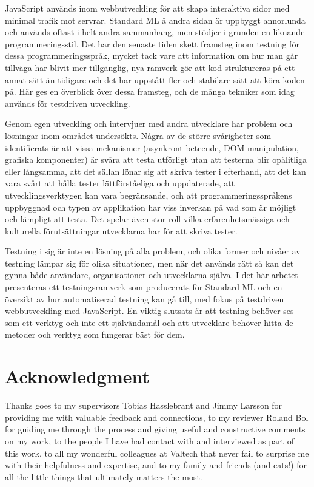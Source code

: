 JavaScript används inom webbutveckling för att skapa interaktiva sidor med minimal trafik mot servrar. Standard ML å andra sidan är uppbyggt annorlunda och används oftast i helt andra sammanhang, men stödjer i grunden en liknande programmeringsstil. Det har den senaste tiden skett framsteg inom testning för dessa programmeringsspråk, mycket tack vare att information om hur man går tillväga har blivit mer tillgänglig, nya ramverk gör att kod struktureras på ett annat sätt än tidigare och det har uppstått fler och stabilare sätt att köra koden på. Här ges en överblick över dessa framsteg, och de många tekniker som idag används för testdriven utveckling.

Genom egen utveckling och intervjuer med andra utvecklare har problem och lösningar inom området undersökts. Några av de större svårigheter som identifierats är att vissa mekanismer (asynkront beteende, DOM-manipulation, grafiska komponenter) är svåra att testa utförligt utan att testerna blir opålitliga eller långsamma, att det sällan lönar sig att skriva tester i efterhand, att det kan vara svårt att hålla tester lättförståeliga och uppdaterade, att utvecklingsverktygen kan vara begränsande, och att programmeringsspråkens uppbyggnad och typen av applikation har viss inverkan på vad som är möjligt och lämpligt att testa. Det spelar även stor roll vilka erfarenhetsmässiga och kulturella förutsättningar utvecklarna har för att skriva tester.

Testning i sig är inte en lösning på alla problem, och olika former och nivåer av testning lämpar sig för olika situationer, men när det används rätt så kan det gynna både användare, organisationer och utvecklarna själva. I det här arbetet presenteras ett testningsramverk som producerats för Standard ML och en översikt av hur automatiserad testning kan gå till, med fokus på testdriven webbutveckling med JavaScript. En viktig slutsats är att testning behöver ses som ett verktyg och inte ett självändamål och att utvecklare behöver hitta de metoder och verktyg som fungerar bäst för dem.

\newpage

\section*{Acknowledgment}

Thanks goes to my supervisors Tobias Hasslebrant and Jimmy Larsson for providing me with valuable feedback and connections, to my reviewer Roland Bol for guiding me through the process and giving useful and constructive comments on my work, to the people I have had contact with and interviewed as part of this work, to all my wonderful colleagues at Valtech that never fail to surprise me with their helpfulness and expertise, and to my family and friends (and cats!) for all the little things that ultimately matters the most.

\newpage
\null
\newpage

\tableofcontents

\newpage

